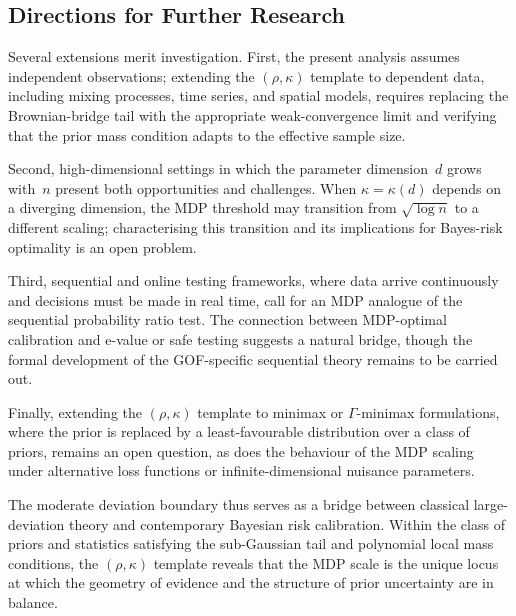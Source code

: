 \documentclass[11pt]{article}
\newcommand{\rhotail}{\rho}  %
\newcommand{\1}{\mathbf{1}}
\theoremstyle{plain}
\theoremstyle{definition}
\theoremstyle{remark}
\begin{document}
\subsection{Directions for Further Research}

Several extensions merit investigation.
First, the present analysis assumes independent observations; extending the $(\rhotail,\kappa)$ template to dependent data, including mixing processes, time series, and spatial models, requires replacing the Brownian-bridge tail with the appropriate weak-convergence limit and verifying that the prior mass condition adapts to the effective sample size.

Second, high-dimensional settings in which the parameter dimension~$d$ grows with~$n$ present both opportunities and challenges.
When $\kappa=\kappa(d)$ depends on a diverging dimension, the MDP threshold may transition from $\sqrt{\log n}$ to a different scaling; characterising this transition and its implications for Bayes-risk optimality is an open problem.

Third, sequential and online testing frameworks, where data arrive continuously and decisions must be made in real time, call for an MDP analogue of the sequential probability ratio test.
The connection between MDP-optimal calibration and e-value or safe testing \citep{DPSZ2026, PSZ2026evalues} suggests a natural bridge, though the formal development of the GOF-specific sequential theory remains to be carried out.

Finally, extending the $(\rhotail,\kappa)$ template to minimax or $\Gamma$-minimax formulations, where the prior is replaced by a least-favourable distribution over a class of priors, remains an open question, as does the behaviour of the MDP scaling under alternative loss functions or infinite-dimensional nuisance parameters.

\medskip

The moderate deviation boundary thus serves as a bridge between classical large-deviation theory and contemporary Bayesian risk calibration.
Within the class of priors and statistics satisfying the sub-Gaussian tail and polynomial local mass conditions, the $(\rhotail,\kappa)$ template reveals that the MDP scale is the unique locus at which the geometry of evidence and the structure of prior uncertainty are in balance.




\end{document}
